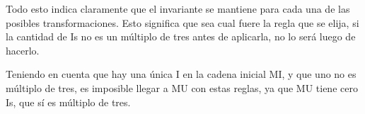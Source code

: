 \begin{subappendices}
Todo esto indica claramente que el invariante se mantiene para cada una de las
posibles transformaciones.  Esto significa que sea cual fuere la regla que se
elija, si la cantidad de Is no es un múltiplo de tres antes de aplicarla, no
lo será luego de hacerlo.

Teniendo en cuenta que hay una única I en la cadena inicial MI, y que uno no
es múltiplo de tres, es imposible llegar a MU con estas reglas, ya que MU
tiene cero Is, que sí es múltiplo de tres.
\end{subappendices}
